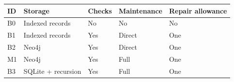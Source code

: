 \begin{tabular}{lllll}
\toprule
ID & Storage & Checks & Maintenance & Repair allowance \\
\midrule
B0 & Indexed records & No & No & No \\
B1 & Indexed records & Yes & Direct & One \\
B2 & Neo4j & Yes & Direct & One \\
M1 & Neo4j & Yes & Full & One \\
B3 & SQLite + recursion & Yes & Full & One \\
\bottomrule
\end{tabular}
